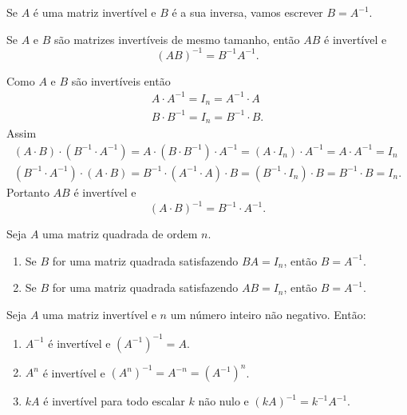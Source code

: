 \begin{notacao}
    Se $A$ é uma matriz invertível e $B$ é a sua inversa, vamos escrever $B = A^{-1}$.
\end{notacao}

\begin{proposicao}
    Se $A$ e $B$ são matrizes invertíveis de mesmo tamanho, então $AB$ é invertível e
    \[
        (AB)^{-1} = B^{-1} A^{-1}.
    \]
\end{proposicao}
\begin{prova}
    Como $A$ e $B$ são invertíveis então
    \begin{align*}
        A\cdot A^{-1} = I_n = A^{-1}\cdot A\\
        B\cdot B^{-1} = I_n = B^{-1}\cdot B.
    \end{align*}
    Assim
    \begin{align*}
        (A\cdot B)\cdot (B^{-1}\cdot A^{-1}) = A \cdot (B \cdot B^{-1})\cdot A^{-1} = (A \cdot I_n) \cdot A^{-1} = A\cdot A^{-1} = I_n\\
        (B^{-1}\cdot A^{-1}) \cdot (A\cdot B) = B^{-1}\cdot (A^{-1} \cdot A)\cdot B = (B^{-1} \cdot I_n) \cdot B = B^{-1}\cdot B = I_n.
    \end{align*}
    Portanto $AB$ é invertível e
    \[
        (A\cdot B)^{-1} = B^{-1}\cdot A^{-1}.
    \]
\end{prova}

\begin{teorema}
    Seja $A$ uma matriz quadrada de ordem $n$.
    \begin{enumerate}[label={\roman*})]
        \item Se $B$ for uma matriz quadrada satisfazendo $BA = I_n$, então $B = A^{-1}$.
        \item Se $B$ for uma matriz quadrada satisfazendo $AB = I_n$, então $B = A^{-1}$.
    \end{enumerate}
\end{teorema}

\begin{proposicao}
    Seja $A$ uma matriz invertível e $n$ um número inteiro não negativo. Então:
    \begin{enumerate}[label={\roman*})]
        \item $A^{-1}$ é invertível e $(A^{-1})^{-1} = A$.

        \item $A^n$ é invertível e $(A^n)^{-1} = A^{-n} = (A^{-1})^n$.

        \item $kA$ é invertível para todo escalar $k$ não nulo e $(kA)^{-1} = k^{-1}A^{-1}$.
    \end{enumerate}
\end{proposicao}

